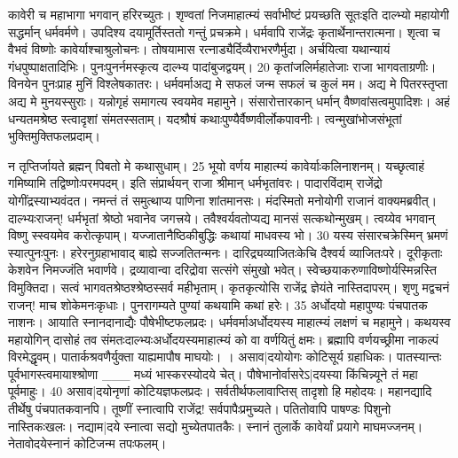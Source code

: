  कावेरी च महाभागा भगवान् हरिरच्युतः।
 शृण्वतां निजमाहात्म्यं सर्वाभीष्टं प्रयच्छति सूतःइति दाल्भ्यो महायोगी सद्धर्मान् धर्मवर्मणे।
 उपदिश्य दयामूर्तिस्ततो गन्तुं प्रचक्रमे।
 धर्मवापि राजेंद्रः कृतार्थेनान्तरात्मना।
 शृत्वा च वैभवं विष्णोः कावेर्याश्चाश्रुलोचनः।
 तोषयामास रत्नाड्यैर्दिव्यैराभरणैर्मुदा।
 अर्चयित्वा यथान्यायं गंधपुष्पाक्षतादिभिः।
 पुनःपुनर्नमस्कृत्य दाल्भ्य पादांबुजद्वयम्।
 20 कृतांजलिर्महातेजाः राजा भागवताग्रणीः।
 विनयेन पुनःप्राह मुनिं विश्लेषकातरः।
 धर्मवर्माअद्य मे सफलं जन्म सफलं च कुलं मम।
 अद्य मे पितरस्तृप्ता अद्य मे मुनयस्सुराः।
 यन्नोगृहं समागत्य स्वयमेव महामुने।
 संसारोत्तारकान् धर्मान् वैष्णवांसत्वमुपादिशः।
 अहं धन्यतमश्रेष्ठ स्त्वादृशां संमतस्सताम्।
 यदश्रौषं कथाःपुण्यैर्वैष्णवीर्लोकपावनीः।
 त्वन्मुखांभोजसंभूतां भुक्तिमुक्तिफलप्रदाम्।
 
न तृप्तिर्जायते ब्रह्मन् पिबतो मे कथासुधाम्।
25 भूयो वर्णय माहात्म्यं कावेर्याःकलिनाशनम्।
 यच्छृत्वाहं गमिष्यामि तद्विष्णोःपरमपदम्।
 इति संप्रार्थयन् राजा श्रीमान् धर्मभृतांवरः।
 पादारविंदाम् राजेंद्रो योगींद्रस्याभ्यवंदत।
 नमन्तं तं समुत्थाप्य पाणिना शांतमानसः।
 मंदस्मितो मनोयोगी राजानं वाक्यमब्रवीत्।
 दाल्भ्यःराजन्! धर्मभृतां श्रेष्ठो भवानेव जगत्त्रये।
 तवैश्वर्यवतोप्यद्य मानसं सत्कथोन्मुखम्।
 त्वय्येव भगवान् विष्णु स्स्वयमेव करोत्कृपाम्।
 यज्जातानैष्ठिकीबुद्धिः कथायां माधवस्य भो।
 30 यस्य संसारचक्रेस्मिन् भ्रमणं स्यात्पुनःपुनः।
 हरेरनुग्रहाभावाद् बाह्ये सज्जतितन्मनः।
 दारिद्र्यव्याजितःकेचि दैश्वर्य व्याजितःपरे।
 दूरीकृताः केशवेन निमज्जंति भवार्णवे।
 द्रव्यावान्वा दरिद्रोवा सत्संगे संमुखो भवेत्।
 स्वेच्छयाकरुणाविष्णोर्यस्मिन्नस्ति विमुक्तिदा।
 सत्वं भागवतश्रेष्ठश्श्रेष्ठस्सर्व महीभृताम्।
 कृतकृत्योसि राजेंद्र ज्ञेयंते नास्तिदापरम्।
 शृणु मद्वचनं राजन्! माच शोकेमनःकृधाः।
 पुनरागम्यते पुण्यां कथयामि कथां हरेः।
 35
अर्धोदयो महापुण्यः पंचपातक नाशनः।
 आयाति स्नानदानाद्यैः पौषेभीष्टफलप्रदः।
 धर्मवर्माअर्धोदयस्य माहात्म्यं लक्षणं च महामुने।
 कथयस्व महायोगिन् दासोहं तव संमतःदाल्भ्यःअर्धोदयस्यमाहात्म्यं को वा वर्णयितुं क्षमः।
 ब्रह्मापि वर्णयच्छ्रीमा नाकल्पं विरमेद्धृवम्।
 पातार्कश्रवणैर्युक्ता याह्यमापौष माघयोः।
 ।
 असाव|दयोयोगः कोटिसूर्य ग्रहाधिकः।
 पातस्यान्तः पूर्वभागस्त्वमायाश्श्रोणा
___ मध्यं भास्करस्योदये चेत्।
 पौषेभानोर्वासरेऽ|दयस्या किंचिन्न्यूने
तं महा पूर्वमाहुः।
 40 असाव|दयोनृणां कोटियज्ञफलप्रदः।
 सर्वतीर्थफलावाप्तिस् तादृशो हि महोदयः।
 महानद्यादि तीर्थेषु पंचपातकवानपि।
 तूष्णीं स्नात्वापि राजेंद्र! सर्वपापैःप्रमुच्यते।
 पतितोवापि पाषण्डः पिशुनो नास्तिकःखलः।
 नद्याम|दये स्नात्वा सद्यो मुच्येतपातकैः।
 स्नानं तुलार्के कावेर्यां प्रयागे माघमज्जनम्।
 नेतावोदयेस्नानं कोटिजन्म तपःफलम्।
 
